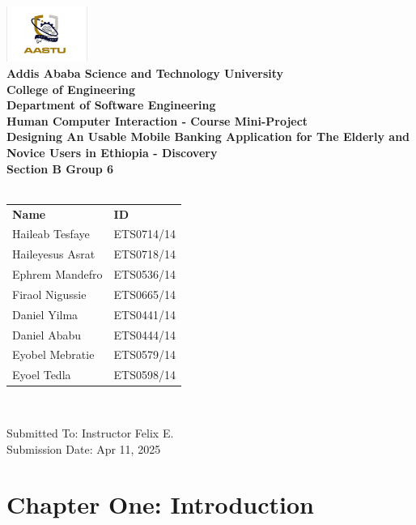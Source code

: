 \documentclass[a4paper,12pt]{report}
\begin{document}
\begin{titlepage}
  \centering
  \includegraphics[width=100px]{../../shared/images/aastu_logo.png} \\
  {\large\bfseries Addis Ababa Science and Technology University} \\
  {\large\bfseries College of Engineering} \\
  {\large\bf Department of Software Engineering} \\[5mm]
  {\Large\bf Human Computer Interaction - Course Mini-Project} \\[5mm]
  {\Huge\bfseries Designing An Usable Mobile Banking Application for The Elderly and Novice Users in Ethiopia - Discovery} \\ [2cm]
  {\Large\bfseries Section B Group 6 } \\[2mm]
  {\Large\bfseries{}} \\ [5mm]
  \begin{tabular}{ll}
    \large\textbf{Name}     & \large\textbf{ID} \\
    \large Haileab Tesfaye  & \large ETS0714/14 \\
    \large Haileyesus Asrat & \large ETS0718/14 \\
    \large Ephrem Mandefro  & \large ETS0536/14 \\
    \large Firaol Nigussie  & \large ETS0665/14 \\
    \large Daniel Yilma     & \large ETS0441/14 \\
    \large Daniel Ababu     & \large ETS0444/14 \\
    \large Eyobel Mebratie  & \large ETS0579/14 \\
    \large Eyoel Tedla      & \large ETS0598/14 \\
  \end{tabular} \\[4cm]

  \begin{flushright}
    {\large Submitted To: Instructor Felix E.}\\
    {\large Submission Date: Apr 11, 2025}
  \end{flushright}

\end{titlepage}
\tableofcontents
\chapter*{Chapter One: Introduction}
\setcounter{chapter}{1}
\setcounter{page}{1}
\end{document}
